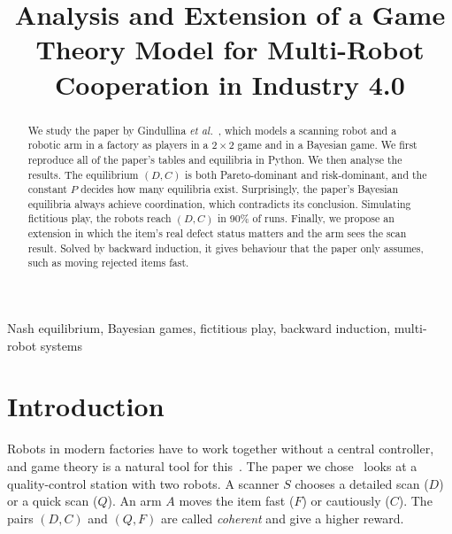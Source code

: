 \documentclass[conference]{IEEEtran}
\begin{document}
\title{Analysis and Extension of a Game Theory Model for Multi-Robot Cooperation in Industry 4.0}

\author{
\and
{}
\and
{}
}

\maketitle

\begin{abstract}
We study the paper by Gindullina \emph{et al.}~\cite{paper}, which models a scanning robot and a robotic arm in a factory as players in a $2\times2$ game and in a Bayesian game. We first reproduce all of the paper's tables and equilibria in Python. We then analyse the results. The equilibrium $(D,C)$ is both Pareto-dominant and risk-dominant, and the constant $P$ decides how many equilibria exist. Surprisingly, the paper's Bayesian equilibria always achieve coordination, which contradicts its conclusion. Simulating fictitious play, the robots reach $(D,C)$ in 90\% of runs. Finally, we propose an extension in which the item's real defect status matters and the arm sees the scan result. Solved by backward induction, it gives behaviour that the paper only assumes, such as moving rejected items fast.
\end{abstract}

\begin{IEEEkeywords}
Nash equilibrium, Bayesian games, fictitious play, backward induction, multi-robot systems
\end{IEEEkeywords}

\section{Introduction}
Robots in modern factories have to work together without a central controller, and game theory is a natural tool for this~\cite{tadelis}. The paper we chose~\cite{paper} looks at a quality-control station with two robots. A scanner $S$ chooses a detailed scan ($D$) or a quick scan ($Q$). An arm $A$ moves the item fast ($F$) or cautiously ($C$). The pairs $(D,C)$ and $(Q,F)$ are called \emph{coherent} and give a higher reward.
\end{document}
